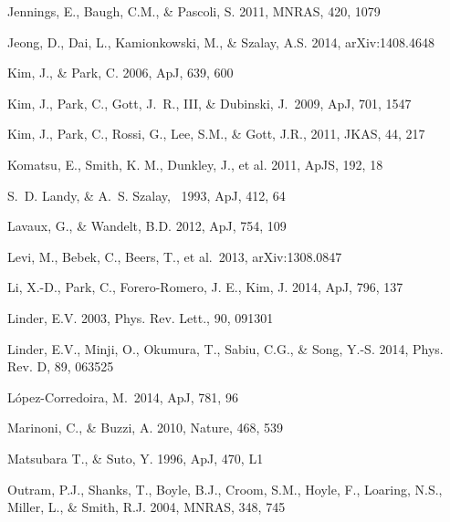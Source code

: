 \documentclass[useAMS,usenatbib]{mn2e}
\begin{document}
\begin{thebibliography}{}
Jennings, E., Baugh, C.M., \& Pascoli, S. 2011, MNRAS, 420, 1079  

Jeong, D., Dai, L., Kamionkowski, M., \& Szalay, A.S. 2014, arXiv:1408.4648

Kim, J., \& Park, C. 2006, ApJ, 639, 600  

 Kim, J., Park, C., Gott, 
J.~R., III, \& Dubinski, J.\ 2009, ApJ, 701, 1547 

Kim, J., Park, C., Rossi, G., Lee, S.M., \& Gott, J.R., 2011, JKAS, 44, 217  

Komatsu, E., Smith, K. M., Dunkley, J., et al. 2011, ApJS, 192, 18  

 S.~D. Landy, \& A.~S. Szalay, \ 1993, ApJ, 412, 64 

Lavaux, G., \& Wandelt, B.D. 2012, ApJ, 754, 109  

Levi, M., Bebek, C., Beers, T., et al.\ 2013, arXiv:1308.0847 

Li, X.-D., Park, C., Forero-Romero, J. E., Kim, J. 2014, ApJ, 796, 137


Linder, E.V. 2003, Phys. Rev. Lett., 90, 091301

Linder, E.V., Minji, O., Okumura, T., Sabiu, C.G., \& Song, Y.-S. 2014, Phys. Rev. D, 89, 063525  

L{\'o}pez-Corredoira, M.\ 2014, ApJ, 781, 96 

Marinoni, C., \& Buzzi, A. 2010, Nature, 468, 539  

Matsubara T., \& Suto, Y. 1996, ApJ, 470, L1  

Outram, P.J., Shanks, T., Boyle, B.J., Croom, S.M., Hoyle, F., Loaring, N.S., 
Miller, L., \& Smith, R.J. 2004, MNRAS, 348, 745  



\end{thebibliography}
\end{document}
